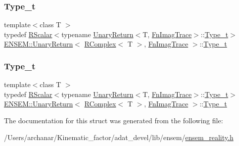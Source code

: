 \subsubsection{\texorpdfstring{Type\_t}{Type\_t}\hspace{0.1cm}{\footnotesize\ttfamily [1/2]}}
{\footnotesize\ttfamily template$<$class T $>$ \\
typedef \mbox{\hyperlink{classENSEM_1_1RScalar}{R\+Scalar}}$<$typename \mbox{\hyperlink{structENSEM_1_1UnaryReturn}{Unary\+Return}}$<$T, \mbox{\hyperlink{structENSEM_1_1FnImagTrace}{Fn\+Imag\+Trace}}$>$\+::\mbox{\hyperlink{structENSEM_1_1UnaryReturn_3_01RComplex_3_01T_01_4_00_01FnImagTrace_01_4_a0a6fd745f329be78992f62eebd7ef256}{Type\+\_\+t}}$>$ \mbox{\hyperlink{structENSEM_1_1UnaryReturn}{E\+N\+S\+E\+M\+::\+Unary\+Return}}$<$ \mbox{\hyperlink{classENSEM_1_1RComplex}{R\+Complex}}$<$ T $>$, \mbox{\hyperlink{structENSEM_1_1FnImagTrace}{Fn\+Imag\+Trace}} $>$\+::\mbox{\hyperlink{structENSEM_1_1UnaryReturn_3_01RComplex_3_01T_01_4_00_01FnImagTrace_01_4_a0a6fd745f329be78992f62eebd7ef256}{Type\+\_\+t}}}

\mbox{\label{structENSEM_1_1UnaryReturn_3_01RComplex_3_01T_01_4_00_01FnImagTrace_01_4_a0a6fd745f329be78992f62eebd7ef256}} 
\subsubsection{\texorpdfstring{Type\_t}{Type\_t}\hspace{0.1cm}{\footnotesize\ttfamily [2/2]}}
{\footnotesize\ttfamily template$<$class T $>$ \\
typedef \mbox{\hyperlink{classENSEM_1_1RScalar}{R\+Scalar}}$<$typename \mbox{\hyperlink{structENSEM_1_1UnaryReturn}{Unary\+Return}}$<$T, \mbox{\hyperlink{structENSEM_1_1FnImagTrace}{Fn\+Imag\+Trace}}$>$\+::\mbox{\hyperlink{structENSEM_1_1UnaryReturn_3_01RComplex_3_01T_01_4_00_01FnImagTrace_01_4_a0a6fd745f329be78992f62eebd7ef256}{Type\+\_\+t}}$>$ \mbox{\hyperlink{structENSEM_1_1UnaryReturn}{E\+N\+S\+E\+M\+::\+Unary\+Return}}$<$ \mbox{\hyperlink{classENSEM_1_1RComplex}{R\+Complex}}$<$ T $>$, \mbox{\hyperlink{structENSEM_1_1FnImagTrace}{Fn\+Imag\+Trace}} $>$\+::\mbox{\hyperlink{structENSEM_1_1UnaryReturn_3_01RComplex_3_01T_01_4_00_01FnImagTrace_01_4_a0a6fd745f329be78992f62eebd7ef256}{Type\+\_\+t}}}



The documentation for this struct was generated from the following file\+:\begin{DoxyCompactItemize}
\item 
/\+Users/archanar/\+Kinematic\+\_\+factor/adat\+\_\+devel/lib/ensem/\mbox{\hyperlink{lib_2ensem_2ensem__reality_8h}{ensem\+\_\+reality.\+h}}\end{DoxyCompactItemize}
